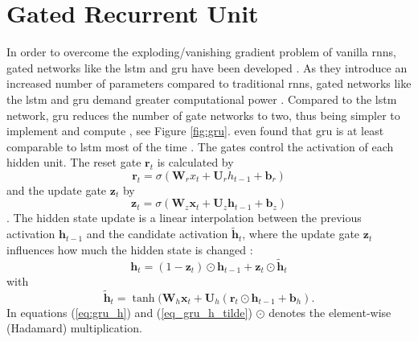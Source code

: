 \documentclass[12pt, a4paper, headinclude, twoside, plainheadsepline, open=right, numbers=noenddot, hidelinks, toc=listof, toc=bibliography]{scrreprt}
\begin{document}
\section{Gated Recurrent Unit}
\label{sec:gru}
In order to overcome the exploding/vanishing gradient problem of vanilla \acp{rnn}, gated networks like the \ac{lstm} \cite{hochreiterLongShortTermMemory1997} and \ac{gru} \cite{choLearningPhraseRepresentations2014} have been developed \cite{vanhoudtReviewLongShortterm2020}.
As they introduce an increased number of parameters compared to traditional \acp{rnn}, gated networks like the \ac{lstm} and \ac{gru} demand greater computational power \cite{deyGatevariantsGatedRecurrent2017}.
Compared to the \ac{lstm} network, \ac{gru} reduces the number of gate networks to two, thus being simpler to implement and compute \cite{choLearningPhraseRepresentations2014}, see Figure \ref{fig:gru}.
 even found that \ac{gru} is at least comparable to \ac{lstm} most of the time \cite{chungEmpiricalEvaluationGated2014}.
The gates control the activation of each hidden unit.
The reset gate $\mathbf{r}_t$ is calculated by
\begin{equation}
\label{eq:gru_reset}
\mathbf{r}_t = \sigma (\mathbf{W}_r x_t + \mathbf{U}_r h_{t-1} + \mathbf{b}_r)
\end{equation}
and the update gate $\mathbf{z}_t$ by
\begin{equation}
\label{eq:gru_update}
\mathbf{z}_t = \sigma (\mathbf{W}_z \mathbf{x}_t + \mathbf{U}_z \mathbf{h}_{t-1} + \mathbf{b}_z)
\end{equation}
\cite{deyGatevariantsGatedRecurrent2017}.
The hidden state update is a linear interpolation between the previous activation $\mathbf{h}_{t-1}$ and the candidate activation $\mathbf{\tilde{h}}_t$, where the update gate $\mathbf{z}_t$ influences how much the hidden state is changed \cite{chungEmpiricalEvaluationGated2014}:
\begin{equation}
\label{eq:gru_h}
\mathbf{h}_t = (1-\mathbf{z}_t) \odot \mathbf{h}_{t-1} + \mathbf{z}_t \odot \mathbf{\tilde{h}}_t
\end{equation}
with
\begin{equation}
\label{eq_gru_h_tilde}
\mathbf{\tilde{h}}_t = \tanh(\mathbf{W}_h \mathbf{x}_t + \mathbf{U}_h (\mathbf{r}_t \odot \mathbf{h}_{t-1} + \mathbf{b}_h).
\end{equation}
In equations (\ref{eq:gru_h}) and (\ref{eq_gru_h_tilde}) $\odot$ denotes the element-wise (Hadamard) multiplication.
\end{document}
